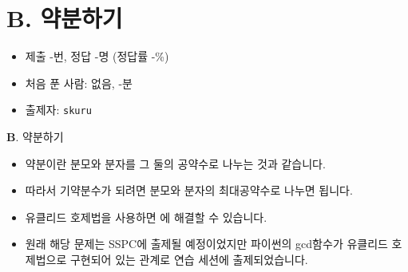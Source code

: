 \section{B. 약분하기}

\begin{frame} %
    \begin{itemize}
        \item 제출 -번, 정답 -명 (정답률 -\%)
        \item 처음 푼 사람: 없음, -분
        \item 출제자: \texttt{skuru}
    \end{itemize}
\end{frame}

\begin{frame}{\textbf{B}. 약분하기}
    \begin{itemize}
        \item 약분이란 분모와 분자를 그 둘의 공약수로 나누는 것과 같습니다.
        \item 따라서 기약분수가 되려면 분모와 분자의 최대공약수로 나누면 됩니다.
        \item 유클리드 호제법을 사용하면 에 해결할 수 있습니다. \\[2em]
        \item 원래 해당 문제는 SSPC에 출제될 예정이었지만 파이썬의 gcd함수가 유클리드 호제법으로 구현되어 있는 관계로 연습 세션에 출제되었습니다.
    \end{itemize}
\end{frame}
